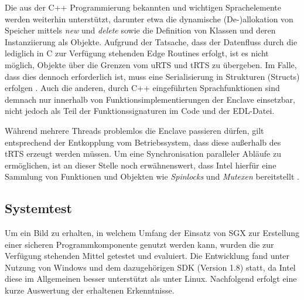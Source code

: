 Die aus der C++ Programmierung bekannten und wichtigen Sprachelemente werden weiterhin unterstützt, darunter etwa die dynamische (De-)allokation von Speicher mittels \textit{new} und \textit{delete} sowie die Definition von Klassen und deren Instanziierung als Objekte. Aufgrund der Tatsache, dass der Datenfluss durch die lediglich in C zur Verfügung stehenden Edge Routines erfolgt, ist es nicht möglich, Objekte über die Grenzen vom \ac{uRTS} und \ac{tRTS} zu übergeben. Im Falle, dass dies dennoch erforderlich ist, muss eine Serialisierung in Strukturen (Structs) erfolgen \cite{LinuxGuide}. Auch die anderen, durch C++ eingeführten Sprachfunktionen sind demnach nur innerhalb von Funktionsimplementierungen der Enclave einsetzbar, nicht jedoch als Teil der Funktionssignaturen im Code und der \ac{EDL}-Datei.

Während mehrere Threads problemlos die Enclave passieren dürfen, gilt entsprechend der Entkopplung vom Betriebssystem, dass diese außerhalb des \ac{tRTS} erzeugt werden müssen. Um eine Synchronisation paralleler Abläufe zu ermöglichen, ist an dieser Stelle noch erwähnenswert, dass Intel hierfür eine Sammlung von Funktionen und Objekten wie \textit{Spinlocks} und \textit{Mutexen} bereitstellt \cite{LinuxGuide}.

\subsection{Systemtest}

Um ein Bild zu erhalten, in welchem Umfang der Einsatz von \ac{SGX} zur Erstellung einer sicheren Programmkomponente genutzt werden kann, wurden die zur Verfügung stehenden Mittel getestet und evaluiert. Die Entwicklung fand unter Nutzung von Windows und dem dazugehörigen \ac{SDK} (Version 1.8) statt, da Intel diese im Allgemeinen besser unterstützt als unter Linux. Nachfolgend erfolgt eine kurze Auswertung der erhaltenen Erkenntnisse.

